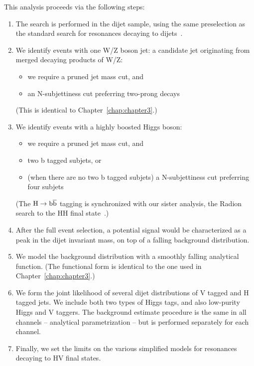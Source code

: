 This analysis proceeds via the following steps:
\begin{enumerate}
\item The search is performed in the dijet sample, using the same
      preselection as the standard search for resonances decaying to 
      dijets~\cite{cmsdijet, cmsdijet8TeV}.

\item We identify events with one W/Z boson jet: a candidate
  jet originating from merged decaying products of W/Z:  
  \begin{itemize}
  \item we require a pruned jet mass cut, and
  \item an N-subjettiness cut preferring two-prong decays
  \end{itemize}
  (This is identical to Chapter~\ref{chap:chapter3}.)

\item We identify events with a highly boosted Higgs boson:
  \begin{itemize}
  \item we require a pruned jet mass cut, and
  \item two b tagged subjets, or 
  \item (when there are no two b tagged subjets) a N-subjettiness cut
    preferring four subjets
  \end{itemize}
  (The ${\rm H\to\mathrm{b\overline{b}}}$ tagging is synchronized with our sister analysis, the Radion
  search to the HH final state~\cite{HH4b}.)

\item After the full event selection, a potential signal would be
  characterized as a peak in the dijet invariant mass, on top of a
  falling background distribution.  

\item We model the background distribution with a smoothly falling 
  analytical function.  (The functional form is identical
  to the one used in Chapter~\ref{chap:chapter3}.)

\item We form the joint likelihood of several dijet distributions
  of V tagged and H tagged jets.  We include both two types of
  Higgs tags, and also low-purity Higgs and V taggers.  The background
  estimate procedure is the same in all channels -- analytical
  parametrization -- but is performed separately for each channel.

\item Finally, we set the limits on the various simplified models
  for resonances decaying to HV final states.

\end{enumerate}
